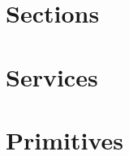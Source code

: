 %
%
%  
%
%
%  
%
%






%
%
%
%
%  
%


\section{Sections}









\section{Services}









\section{Primitives}









